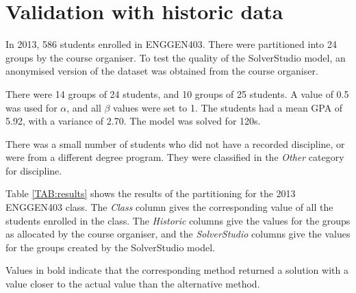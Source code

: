 \documentclass[12pt]{ORSNZ}
\begin{document}
\section{Validation with historic data}
In 2013, 586 students enrolled in ENGGEN403. There were partitioned into 24 groups by the course organiser. To test the quality of the SolverStudio model, an anonymised version of the dataset was obtained from the course organiser.

There were 14 groups of 24 students, and 10 groups of 25 students. A value of 0.5 was used for $\alpha$, and all $\beta$ values were set to 1. The students had a mean GPA of 5.92, with a variance of 2.70. The model was solved for 120s. 

There was a small number of students who did not have a recorded discipline, or were from a different degree program. They were classified in the \emph{Other} category for discipline. 

Table \ref{TAB:results} shows the results of the partitioning for the 2013 ENGGEN403 class. The \emph{Class} column gives the corresponding value of all the students enrolled in the class. The \emph{Historic} columns give the values for the groups as allocated by the course organiser, and the \emph{SolverStudio} columns give the values for the groups created by the SolverStudio model.

Values in bold indicate that the corresponding method returned a solution with a value closer to the actual value than the alternative method.
\end{document}
